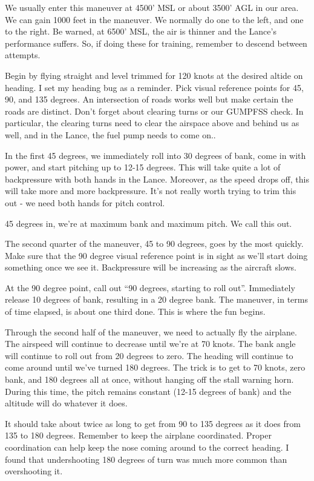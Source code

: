 We usually enter this maneuver at 4500' MSL or about 3500' AGL in our area. We can gain 1000 feet in the maneuver. We normally do one to the left, and one to the right. Be warned, at 6500' MSL, the air is thinner and the Lance's performance suffers. So, if doing these for training, remember to descend between attempts.

Begin by flying straight and level trimmed for 120 knots at the desired altide on heading. I set my heading bug as a reminder. Pick visual reference points for 45, 90, and 135 degrees. An intersection of roads works well but make certain the roads are distinct. Don't forget about clearing turns or our GUMPFSS check. In particular, the clearing turns need to clear the airspace above and behind us as well, and in the Lance, the fuel pump needs to come on..

In the first 45 degrees, we immediately roll into 30 degrees of bank, come in with power, and start pitching up to 12-15 degrees. This will take quite a lot of backpressure with both hands in the Lance. Moreover, as the speed drops off, this will take more and more backpressure. It's not really worth trying to trim this out - we need both hands for pitch control.

45 degrees in, we're at maximum bank and maximum pitch. We call this out.

The second quarter of the maneuver, 45 to 90 degrees, goes by the most quickly. Make sure that the 90 degree visual reference point is in sight as we'll start doing something once we see it. Backpressure will be increasing as the aircraft slows.

At the 90 degree point, call out ``90 degrees, starting to roll out''. Immediately release 10 degrees of bank, resulting in a 20 degree bank. The maneuver, in terms of time elapsed, is about one third done. This is where the fun begins.

Through the second half of the maneuver, we need to actually fly the airplane. The airspeed will continue to decrease until we're at 70 knots. The bank angle will continue to roll out from 20 degrees to zero. The heading will continue to come around until we've turned 180 degrees. The trick is to get to 70 knots, zero bank, and 180 degrees all at once, without hanging off the stall warning horn. During this time, the pitch remains constant (12-15 degrees of bank) and the altitude will do whatever it does.

It should take about twice as long to get from 90 to 135 degrees as it does from 135 to 180 degrees. Remember to keep the airplane coordinated. Proper coordination can help keep the nose coming around to the correct heading. I found that undershooting 180 degrees of turn was much more common than overshooting it.


